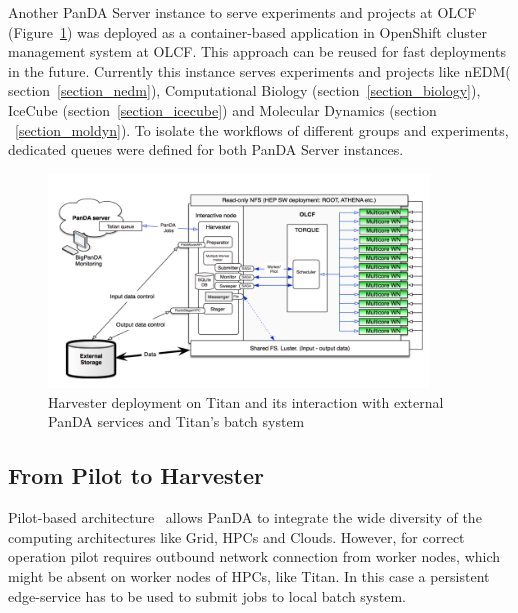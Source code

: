 \documentclass{webofc}
\begin{document}
Another  PanDA Server instance to serve experiments and projects at OLCF (Figure~\ref{fig:panda-OLCF}) was deployed as a container-based application in OpenShift cluster management system at OLCF. This approach can be reused for fast deployments in the future. Currently this instance serves experiments and projects like nEDM( section~\ref{section_nedm}), Computational Biology (section~\ref{section_biology}), IceCube (section~\ref{section_icecube}) and Molecular Dynamics (section ~\ref{section_moldyn}).
To isolate the workflows of different groups and experiments, dedicated queues were defined for both PanDA Server instances. 



\begin{figure}
  \centering
  \includegraphics[width=0.90\textwidth]{figures/Panda_at_OLCF.png}
  \caption{Harvester deployment on Titan and its interaction with external PanDA services and Titan's batch system}
  \label{fig:panda-OLCF}
\end{figure}

\subsection{From Pilot to Harvester} \label{section_harvester}

Pilot-based architecture~\cite{Nilsson_2008} allows PanDA to integrate the wide diversity of the computing architectures like Grid,  HPCs and Clouds. However, for correct operation pilot requires outbound network connection from worker nodes, which might be absent on worker nodes of HPCs, like Titan. In this case a persistent edge-service has to be used to submit jobs to local batch system.
\end{document}
